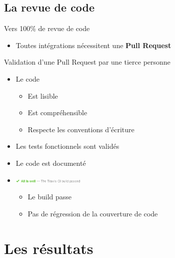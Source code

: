 \documentclass{beamer}
\begin{document}
\subsection{La revue de code}
\begin{frame}{Vers 100\% de revue de code}
\begin{itemize}
\item Toutes intégrations nécessitent une \textbf{Pull Request}
\end{itemize}
\vfill
\pause
\begin{block}{\normalsize Validation d'une Pull Request par une tierce personne}
	\begin{itemize}
		\item Le code
			\begin{itemize}
				\item Est lisible
				\item Est compréhensible
				\item Respecte les conventions d'écriture
			\end{itemize}
		\item Les tests fonctionnels sont validés
		\item Le code est documenté
		\item \includegraphics[height=7px]{images/all_is_well.png}
		\begin{itemize}
		\item Le build passe
		\item Pas de régression de la couverture de code
	\end{itemize}
	\end{itemize}
\end{block}	
\end{frame}
\section{Les résultats} %
\end{document}
